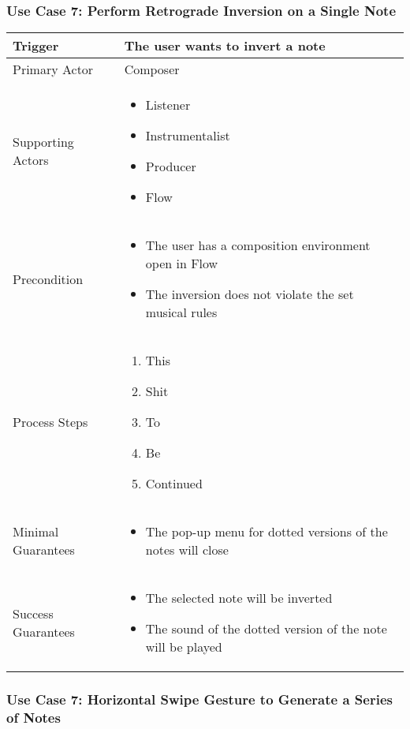 \subsubsection{Use Case 7: Perform Retrograde Inversion on a Single Note}

\begin{tabularx}{\textwidth}{|X|X|}
\hline
Trigger & 
The user wants to invert a note \\
\hline
Primary Actor & 
Composer \\
\hline
Supporting Actors & 
\begin{itemize}
\item Listener
\item Instrumentalist
\item Producer
\item Flow
\end{itemize} \\
\hline
Precondition & 
\begin{itemize}
\item The user has a composition environment open in Flow
\item The inversion does not violate the set musical rules
\end{itemize} \\
\hline
Process Steps & 
\begin{enumerate}
\item This
\item Shit
\item To
\item Be
\item Continued
\end{enumerate} \\
\hline
Minimal Guarantees & 
\begin{itemize}
  \item The pop-up menu for dotted versions of the notes will close
\end{itemize} \\
\hline
Success Guarantees & 
\begin{itemize}
  \item The selected note will be inverted
  \item The sound of the dotted version of the note will be played 
\end{itemize} \\
\hline
\end{tabularx}

\subsubsection{Use Case 7: Horizontal Swipe Gesture to Generate a Series of Notes}

